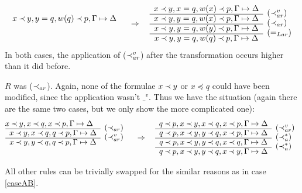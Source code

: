 \begin{PROOF}
\begin{LS}
\begin{LSA}
\begin{LSB}
\[\begin{array}{cl}
x\Incl y, y=q, w(q)\Incl p,\GSD \\  \ 
\end{array}
\conv
 \begin{array}{cl}
x\Incl y, x=q, w(x)\Incl p,\GSD  & \raisebox{-1.2ex}[1.5ex][0ex]{($\Incl_{ar}^v$)} \\ \cline{1-1}
x\Incl y, y=q, w(x)\Incl p, \GSD &
\raisebox{-1.2ex}[1.5ex][0ex]{($\Incl_{ar}$)} \\ \cline{1-1}
x\Incl y, y=q, w(y)\Incl p, \GSD &
\raisebox{-1.2ex}[1.5ex][0ex]{($=_{Lar}$)} \\ \cline{1-1}
x\Incl y, y=q, w(q)\Incl p, \GSD &
\end{array}
\]
In both cases, the application of ($\mathbin{\prec}_{ar}^v$) after the transformation occurs higher 
than it did before.
\end{LSB}
\item $R$ was ($\mathbin{\prec}_{ar}$). Again, none of the formulae $x\mathbin{\prec} y$ or $x\preceq q$ could 
have been modified, since the application wasn't $\_^v$. Thus we have the situation (again
there are the same two cases, but we only show the more complicated one):
\[ \begin{array}{cl} \hspace*{-1em}
x\Incl y, x\Incl q, x\Incl p,\GSD    & \raisebox{-1.2ex}[1.5ex][0ex]{($\Incl_{ar}$)} \\ \cline{1-1}
x\Incl y, x\Incl q, q\Incl p, \GSD &
\raisebox{-1.2ex}[1.5ex][0ex]{($\Incl_{ar}^v$)} \\ \cline{1-1}
x\Incl y, y\Incl q, q\Incl p,\GSD \\  \ 
\end{array}
\conv
\begin{array}{cl}
q\Incl p, x\Incl y, x\Incl q, x\Incl p,\GSD    & \raisebox{-1.2ex}[1.5ex][0ex]{($\Incl_{ar}^v$)} \\ \cline{1-1}
q\Incl p, x\Incl y, y\Incl q, x\Incl p, \GSD &
\raisebox{-1.2ex}[1.5ex][0ex]{($\Incl_{a}^*$)} \\ \cline{1-1}
q\Incl p, x\Incl y, y\Incl q, x\Incl q, \GSD &
\raisebox{-1.2ex}[1.5ex][0ex]{($\Incl_{a}^*$)} \\ \cline{1-1}
q\Incl p, x\Incl y, y\Incl q, x\Incl y, \GSD &
\end{array}
\]
\item All other rules can be trivially swapped for the similar reasons as in 
case \ref{caseAB}.
\end{LSA}
\end{LS}
\end{PROOF}
%

